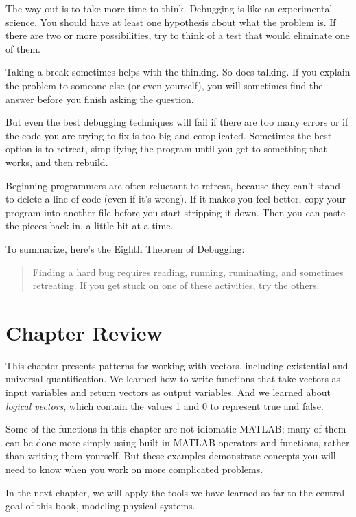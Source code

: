 
The way out is to take more time to think.  Debugging is like an
experimental science.  You should have at least one hypothesis about
what the problem is.  If there are two or more possibilities, try to
think of a test that would eliminate one of them.


Taking a break sometimes helps with the thinking.  So does talking.
If you explain the problem to someone else (or even yourself), you
will sometimes find the answer before you finish asking the question.

But even the best debugging techniques will fail if there are too many
errors or if the code you are trying to fix is too big and
complicated.  Sometimes the best option is to retreat, simplifying the
program until you get to something that works, and then rebuild.

Beginning programmers are often reluctant to retreat, because
they can't stand to delete a line of code (even if it's wrong).
If it makes you feel better, copy your program into another file
before you start stripping it down.  Then you can paste the pieces
back in, a little bit at a time.


To summarize, here's the Eighth Theorem of Debugging:

\begin{quote}
Finding a hard bug requires reading, running, ruminating,
and sometimes retreating.  If you get stuck on one of these
activities, try the others.
\end{quote}

\section{Chapter Review}

This chapter presents patterns for working with vectors, including existential and universal quantification.
We learned how to write functions that take vectors as input variables and return vectors as output variables.
And we learned about \emph{logical vectors}, which contain the values 1 and 0 to represent true and false.

Some of the functions in this chapter are not idiomatic MATLAB; many of them can be done more simply using built-in MATLAB operators and functions, rather than writing them yourself.  But these examples demonstrate concepts you will need to know when you work on more complicated problems.

In the next chapter, we will apply the tools we have learned so far to the central goal of this book, modeling physical systems.





